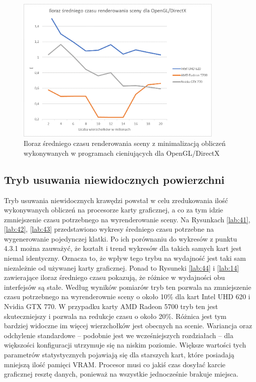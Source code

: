 \documentclass[archive]{mgr}
\begin{document}
\begin{figure}[h!]
  \centering
    \includegraphics[width=0.9\textwidth]{images/shaderoff/4.png}
   \caption{Iloraz średniego czasu renderowania sceny z minimalizacją obliczeń wykonywanych w programach cieniujących dla OpenGL/DirectX}
   \label{lab:34}
\end{figure}

\subsection{Tryb usuwania niewidocznych powierzchni}

Tryb usuwania niewidocznych krawędzi powstał w celu zredukowania ilość wykonywanych obliczeń na procesorze karty graficznej, a co za tym idzie zmniejszenie czasu potrzebnego na wyrenderowanie sceny. Na Rysunkach \ref{lab:41}, \ref{lab:42}, \ref{lab:43} przedstawiono wykresy średniego czasu potrzebne na wygenerowanie pojedynczej klatki. Po ich porównaniu do wykresów z punktu 4.3.1 można zauważyć, że kształt i trend wykresów dla takich samych kart jest niemal identyczny. Oznacza to, że wpływ tego trybu na wydajność jest taki sam niezależnie od używanej karty graficznej. Ponad to Rysuneki \ref{lab:44} i \ref{lab:14} zawierające iloraz średniego czasu pokazują, że różnice w wydajności obu interfejsów są stałe. Według wyników pomiarów tryb ten pozwala na zmniejszenie czasu potrzebnego na wyrenderownie sceny o około 10\% dla kart Intel UHD 620 i Nvidia GTX 770. W przypadku karty AMD Radeon 5700 tryb ten jest skuteczniejszy i pozwala na redukcje czasu o około 20\%. Różnica jest tym bardziej widoczne im więcej wierzchołków jest obecnych na scenie. Wariancja oraz odchylenie standardowe – podobnie jest we wcześniejszych rozdziałach – dla większości konfiguracji utrzymuje się na niskim poziomie. Większe wartości tych parametrów statystycznych pojawiają się dla starszych kart, które posiadają mniejszą ilość pamięci VRAM. Procesor musi co jakiś czas dosyłać karcie graficznej resztę danych, ponieważ na wszystkie jednocześnie brakuje miejsca. 
\end{document}
